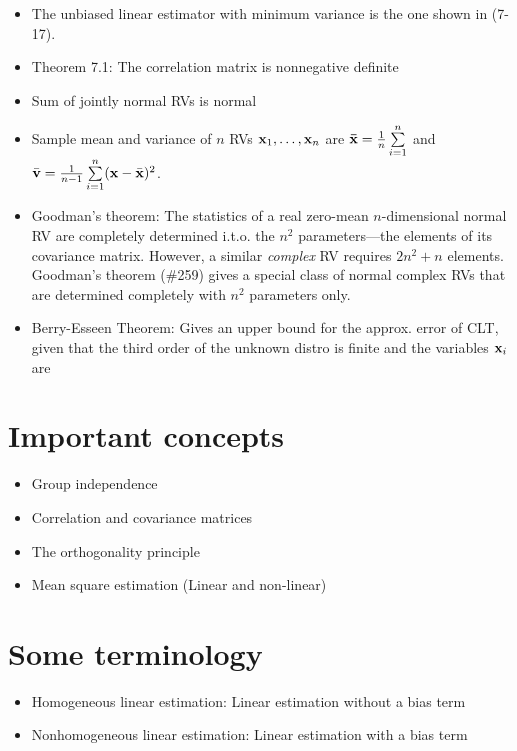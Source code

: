 \documentclass[a4paper]{book}
\begin{document}
\begin{itemize}
\item The unbiased linear estimator with minimum variance is the one shown in (7-17).
\item Theorem 7.1: The correlation matrix is nonnegative definite
\item Sum of jointly normal RVs is normal
\item Sample mean and variance of $n$ RVs $\mathbf{x}_1, \hdots, \mathbf{x}_n$ are $\mathbf{\bar{x}} = \frac{1}{n}\sum\limits_{i=1}^n$ and $\bar{\mathbf{v}} = \frac{1}{n-1}\sum\limits_{i=1}^n(\mathbf{x}-\bar{\mathbf{x}})^2$.
\item Goodman's theorem: The statistics of a real zero-mean $n$-dimensional normal RV are completely determined i.t.o. the $n^2$ parameters\----the elements of its covariance matrix. However, a similar \textit{complex} RV requires $2n^2+n$ elements. Goodman's theorem (\#259) gives a special class of normal complex RVs that are determined completely with $n^2$ parameters only.
\item Berry-Esseen Theorem: Gives an upper bound for the approx. error of CLT, given that the third order of the unknown distro is finite and the variables $\mathbf{x}_i$ are \iid
\end{itemize}

\section{Important concepts}

\begin{itemize}
\item Group independence
\item Correlation and covariance matrices
\item The orthogonality principle
\item Mean square estimation (Linear and non-linear)
\end{itemize}

\section{Some terminology}
\begin{itemize}
\item Homogeneous linear estimation:  Linear estimation without a bias term
\item Nonhomogeneous linear estimation: Linear estimation with a bias term

\end{itemize}
\end{document}
